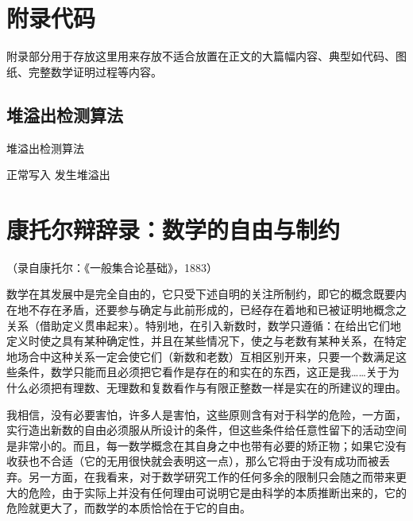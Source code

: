\chapter{附录代码}

附录部分用于存放这里用来存放不适合放置在正文的大篇幅内容、典型如代码、图纸、完整数学证明过程等内容。

\section{堆溢出检测算法}

\begin{algorithm}[h]
    \caption{堆溢出检测算法}\label{alg:ovf}
    \begin{algorithmic}[1]
            \STATE 正常写入
            \STATE 发生堆溢出
        \ENDIF
    \end{algorithmic}
\end{algorithm}


\chapter{康托尔辩辞录：数学的自由与制约}

（录自康托尔：《一般集合论基础》，1883）

数学在其发展中是完全自由的，它只受下述自明的关注所制约，即它的概念既要内在地不存在矛盾，还要参与确定与此前形成的，已经存在着地和已被证明地概念之关系（借助定义贯串起来）。特别地，在引入新数时，数学只遵循：在给出它们地定义时使之具有某种确定性，并且在某些情况下，使之与老数有某种关系，在特定地场合中这种关系一定会使它们（新数和老数）互相区别开来，只要一个数满足这些条件，数学只能而且必须把它看作是存在的和实在的东西，这正是我……关于为什么必须把有理数、无理数和复数看作与有限正整数一样是实在的所建议的理由。

我相信，没有必要害怕，许多人是害怕，这些原则含有对于科学的危险，一方面，实行造出新数的自由必须服从所设计的条件，但这些条件给任意性留下的活动空间是非常小的。而且，每一数学概念在其自身之中也带有必要的矫正物；如果它没有收获也不合适（它的无用很快就会表明这一点），那么它将由于没有成功而被丢弃。另一方面，在我看来，对于数学研究工作的任何多余的限制只会随之而带来更大的危险，由于实际上并没有任何理由可说明它是由科学的本质推断出来的，它的危险就更大了，而数学的本质恰恰在于它的自由。

